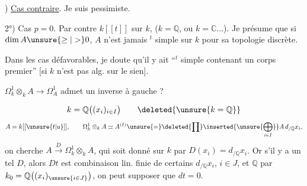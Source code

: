 
) \uline{Cas contraire}. Je suis pessimiste.

2°) Cas $p=0$. Par contre $k[[t]]$ sur $k$,
($k=\mathbb Q$, ou $k=\mathbb C\ldots$). Je présume que
si $\dim A\unsure{\geq|>}0$, $A$ n'est jamais $^t$ simple
sur $k$ pour sa topologie discrète.

Dans les cas défavorables, je doute qu'il
y ait  ``$^t$ simple contenant un corps
premier'' [si $k$ n'est pas alg. sur le sien].

$\Omega^1_k\otimes_k A\longrightarrow\Omega^1_A$
admet un inverse à gauche ?

\[
k=\mathbb Q\bigl((x_i)_{i\in I}\bigr)
\qquad \deleted{\unsure{k=\mathbb Q}}
\]
\[
A=k[[\unsure{t|u}]],\qquad
\Omega^1_k\otimes_k A\simeq A^{(I)}
\unsure{=}\deleted{\prod}\inserted{\unsure{\bigoplus_{i\in I}}}
A\,d_{/\mathbb Q}x_i,
\]
on cherche $A\xrightarrow{D}\Omega^1_k\otimes_k A$, qui soit
donné sur $k$ par $D(x_i)=d_{/\mathbb Q}x_i$.
Or s'il y a un tel $D$, alors $Dt$ est combinaison lin.
finie de certains $d_{/\mathbb Q}x_i$, $i\in J$, et 
$\mathbb Q$ par $k_0=\mathbb Q\bigl((x_i)_{\unsure{i\in J}}\bigr)$,
on peut supposer que
$dt=0$.

